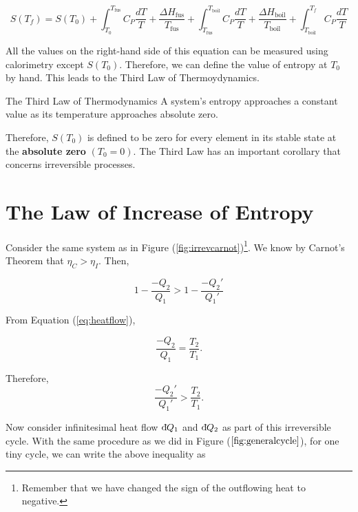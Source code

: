         \begin{equation}
            S(T_f) = S(T_0) +\int_{T_0}^{T_\text{fus}}C_P\frac{dT}{T} + \frac{\Delta H_\text{fus}}{T_\text{fus}} + \int_{T_\text{fus}}^{T_\text{boil}}C_P\frac{dT}{T} + \frac{\Delta H_\text{boil}}{T_\text{boil}} + \int_{T_\text{boil}}^{T_f}C_P\frac{dT}{T}
        \end{equation}
        
        All the values on the right-hand side of this equation can be measured using calorimetry except $S(T_0)$. Therefore, we can define the value of entropy at $T_0$ by hand. This leads to the Third Law of Thermoydynamics.
        \begin{law*}{The Third Law of Thermodynamics}
            A system's entropy approaches a constant value as its temperature approaches absolute zero. 
        \end{law*}
        Therefore, $S(T_0)$ is defined to be zero for every element in its stable state at the \textbf{absolute zero} $(T_0=0)$. The Third Law has an important corollary that concerns irreversible processes.
    \section{The Law of Increase of Entropy}
        Consider the same system as in Figure (\ref{fig:irrevcarnot})\footnote{Remember that we have changed the sign of the outflowing heat to negative.}. We know by Carnot's Theorem that $\eta_C > \eta_I$. Then,
        
        \begin{equation}
            1-\frac{-Q_2}{Q_1} > 1- \frac{-Q_2'}{Q_1'}
        \end{equation}
        
        From Equation (\ref{eq:heatflow}), 
        
        \begin{equation}
            \frac{-Q_2}{Q_1} = \frac{T_2}{T_1}. 
        \end{equation}
        
        Therefore,
        \begin{equation}
            \frac{-Q_2'}{Q_1'} > \frac{T_2}{T_1}.
        \end{equation}
        
        Now consider infinitesimal heat flow $\text{d}\hspace*{-0.13em}\bar{}\hspace*{0.1em} Q_1$ and $\text{d}\hspace*{-0.13em}\bar{}\hspace*{0.1em} Q_2$ as part of this irreversible cycle. With the same procedure as we did in Figure ($\ref{fig:generalcycle}$), for one tiny cycle, we can write the above inequality as
        
